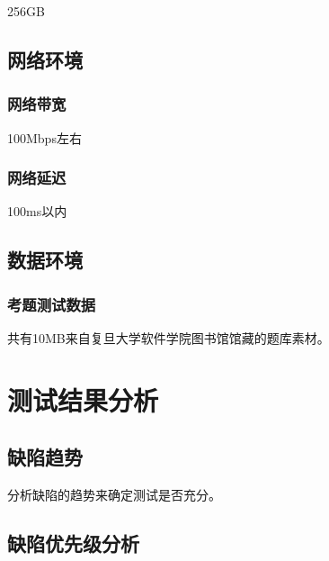 \documentclass[hyperref, a4paper]{ctexart}
\begin{document}
256GB

\hypertarget{ux7f51ux7edcux73afux5883}{%
\subsection{网络环境}\label{ux7f51ux7edcux73afux5883}}

\hypertarget{ux7f51ux7edcux5e26ux5bbd}{%
\subsubsection{网络带宽}\label{ux7f51ux7edcux5e26ux5bbd}}

100Mbps左右

\hypertarget{ux7f51ux7edcux5ef6ux8fdf}{%
\subsubsection{网络延迟}\label{ux7f51ux7edcux5ef6ux8fdf}}

100ms以内

\hypertarget{ux6570ux636eux73afux5883}{%
\subsection{数据环境}\label{ux6570ux636eux73afux5883}}

\hypertarget{ux8003ux9898ux6d4bux8bd5ux6570ux636e}{%
\subsubsection{考题测试数据}\label{ux8003ux9898ux6d4bux8bd5ux6570ux636e}}

共有10MB来自复旦大学软件学院图书馆馆藏的题库素材。

\hypertarget{ux6d4bux8bd5ux7ed3ux679cux5206ux6790}{%
\section{测试结果分析}\label{ux6d4bux8bd5ux7ed3ux679cux5206ux6790}}

\hypertarget{ux7f3aux9677ux8d8bux52bf}{%
\subsection{缺陷趋势}\label{ux7f3aux9677ux8d8bux52bf}}

分析缺陷的趋势来确定测试是否充分。

\hypertarget{ux7f3aux9677ux4f18ux5148ux7ea7ux5206ux6790}{%
\subsection{缺陷优先级分析}\label{ux7f3aux9677ux4f18ux5148ux7ea7ux5206ux6790}}
\end{document}

